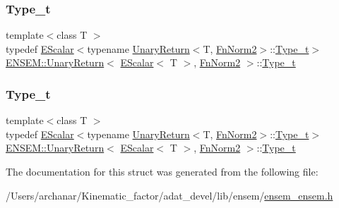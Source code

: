 \subsubsection{\texorpdfstring{Type\_t}{Type\_t}\hspace{0.1cm}{\footnotesize\ttfamily [1/2]}}
{\footnotesize\ttfamily template$<$class T $>$ \\
typedef \mbox{\hyperlink{classENSEM_1_1EScalar}{E\+Scalar}}$<$typename \mbox{\hyperlink{structENSEM_1_1UnaryReturn}{Unary\+Return}}$<$T, \mbox{\hyperlink{structENSEM_1_1FnNorm2}{Fn\+Norm2}}$>$\+::\mbox{\hyperlink{structENSEM_1_1UnaryReturn_3_01EScalar_3_01T_01_4_00_01FnNorm2_01_4_acb54ade58c6e4e3f443f349d5ddb92e1}{Type\+\_\+t}}$>$ \mbox{\hyperlink{structENSEM_1_1UnaryReturn}{E\+N\+S\+E\+M\+::\+Unary\+Return}}$<$ \mbox{\hyperlink{classENSEM_1_1EScalar}{E\+Scalar}}$<$ T $>$, \mbox{\hyperlink{structENSEM_1_1FnNorm2}{Fn\+Norm2}} $>$\+::\mbox{\hyperlink{structENSEM_1_1UnaryReturn_3_01EScalar_3_01T_01_4_00_01FnNorm2_01_4_acb54ade58c6e4e3f443f349d5ddb92e1}{Type\+\_\+t}}}

\mbox{\label{structENSEM_1_1UnaryReturn_3_01EScalar_3_01T_01_4_00_01FnNorm2_01_4_acb54ade58c6e4e3f443f349d5ddb92e1}} 
\subsubsection{\texorpdfstring{Type\_t}{Type\_t}\hspace{0.1cm}{\footnotesize\ttfamily [2/2]}}
{\footnotesize\ttfamily template$<$class T $>$ \\
typedef \mbox{\hyperlink{classENSEM_1_1EScalar}{E\+Scalar}}$<$typename \mbox{\hyperlink{structENSEM_1_1UnaryReturn}{Unary\+Return}}$<$T, \mbox{\hyperlink{structENSEM_1_1FnNorm2}{Fn\+Norm2}}$>$\+::\mbox{\hyperlink{structENSEM_1_1UnaryReturn_3_01EScalar_3_01T_01_4_00_01FnNorm2_01_4_acb54ade58c6e4e3f443f349d5ddb92e1}{Type\+\_\+t}}$>$ \mbox{\hyperlink{structENSEM_1_1UnaryReturn}{E\+N\+S\+E\+M\+::\+Unary\+Return}}$<$ \mbox{\hyperlink{classENSEM_1_1EScalar}{E\+Scalar}}$<$ T $>$, \mbox{\hyperlink{structENSEM_1_1FnNorm2}{Fn\+Norm2}} $>$\+::\mbox{\hyperlink{structENSEM_1_1UnaryReturn_3_01EScalar_3_01T_01_4_00_01FnNorm2_01_4_acb54ade58c6e4e3f443f349d5ddb92e1}{Type\+\_\+t}}}



The documentation for this struct was generated from the following file\+:\begin{DoxyCompactItemize}
\item 
/\+Users/archanar/\+Kinematic\+\_\+factor/adat\+\_\+devel/lib/ensem/\mbox{\hyperlink{lib_2ensem_2ensem__ensem_8h}{ensem\+\_\+ensem.\+h}}\end{DoxyCompactItemize}
